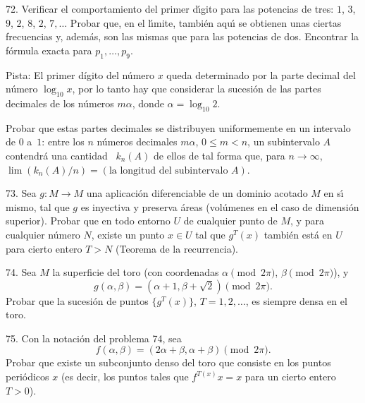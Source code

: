 \begin{problem}{72.}
	Verificar el comportamiento del primer d\'{\i}gito para las potencias de tres: $1$, $3$, $9$, $2$, $8$, $2$, $7, \dotsc$ Probar que, en el l\'{\i}mite, tambi\'en aqu\'{\i} se obtienen unas ciertas frecuencias y, adem\'as, son las mismas que para las potencias de dos.
	Encontrar la f\'ormula exacta para $p_1, \dotsc, p_9$.
	\begin{note}{Pista:}
		El primer d\'igito del n\'umero $x$ queda determinado por la parte decimal del n\'umero  $\log_{10} x$, por lo tanto hay que considerar la sucesi\'on de las partes decimales de los n\'umeros $m \alpha$, donde $\alpha=\log_{10} 2$.
	\end{note}

	Probar que estas partes decimales se distribuyen uniformemente en un intervalo de $0$ a~$1$: entre los $n$ n\'umeros decimales $m \alpha$, $0 \leqslant m<n$,
	un subintervalo $A$ contendr\'a una cantidad ~$k_n (A)$ de ellos de tal forma que, para $n \to \infty$, $\lim (k_n (A)/n)=(\text{la longitud del subintervalo }A)$.
\end{problem}

\begin{problem}{73.}
	 Sea $g\colon M\to M$ una aplicaci\'on diferenciable de un dominio acotado $M$ en s\'{\i} mismo, tal que $g$ es inyectiva y preserva \'areas (vo\-l\'u\-me\-nes en el caso de dimensi\'on superior).
Probar que en todo entorno $U$ de cualquier punto de $M$, y para cualquier n\'umero $N$, existe un punto $x\in U$ tal que $g^T(x)$ tambi\'en est\'a en $U$ para cierto entero $T>N$ (Teorema de la recurrencia).
	\end{problem}

\begin{problem}{74.}
	Sea $M$ la superficie del toro (con coordenadas $\alpha \pmod{2\pi}$, $\beta\pmod{2\pi}$), y
	\begin{equation*}
		g(\alpha, \beta)=(\alpha+1, \beta+ \sqrt{2}) \pmod{2\pi}.
	\end{equation*}
	Probar que la sucesi\'on de puntos $\{g^T (x)\}$, $T=1, 2, \dotsc$, es siempre densa en el toro.
\end{problem}

\begin{problem}{75.}
	Con la notaci\'on del problema  74, sea
	\begin{equation*}
		f(\alpha, \beta)=(2\alpha+\beta,\alpha+\beta) \pmod{2\pi}.
	\end{equation*}
	Probar que existe un subconjunto denso del toro que consiste en los puntos peri\'odicos $x$ (es decir, los puntos tales que 
	$f^{T (x)} x=x$ para un cierto entero $T>0$).
\end{problem}

